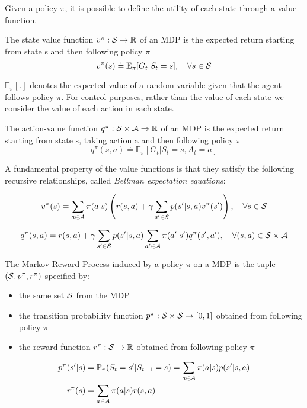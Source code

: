 Given a policy $\pi$, it is possible to define the utility of each state through a value function.
\begin{definition}
    The state value function $v^\pi: \mathcal{S} \to \mathbb{R}$ of an MDP is the expected return starting from state s and then following policy $\pi$
    \[v^\pi(s) \doteq \mathbb{E}_\pi[G_t | S_t=s],\quad \forall s \in \mathcal{S}\]
\end{definition}

$\mathbb{E}_\pi[.]$ denotes the expected value of a random variable given that the agent follows policy $\pi$. 
For control purposes, rather than the value of each state we consider the value of each action in each state.
\begin{definition}
    The action-value function $q^\pi: \mathcal{S} \times \mathcal{A} \to \mathbb{R}$ of an MDP is the expected return starting from state s, taking action a and then following policy $\pi$
    \[q^\pi(s,a) \doteq \mathbb{E}_\pi[G_t | S_t=s, A_t=a]\]
\end{definition}

A fundamental property of the value functions is that they satisfy
the following recursive relationships, called \textit{Bellman expectation equations}:

\begin{equation}
    \label{eq:bellman_v}
    v^\pi(s) = \sum_{a \in \mathcal{A}}\pi(a | s)\left( r(s, a) + \gamma \sum_{s' \in \mathcal{S}} p(s'|s,a) v^\pi(s') \right),\quad \forall s \in \mathcal{S}
\end{equation}

\begin{equation}
\label{eq:bellman_q}
q^\pi(s,a) = r(s,a) + \gamma \sum_{s' \in \mathcal{S}} p(s'|s,a)\sum_{a' \in \mathcal{A}}\pi(a'|s')q^\pi(s',a'),\quad \forall(s,a) \in \mathcal{S}\times\mathcal{A}
\end{equation}


\begin{definition}
    The Markov Reward Process induced by a policy $\pi$ on a MDP is the tuple $(\mathcal{S}, p^\pi, r^\pi)$ specified by:
    \begin{itemize}
    \item the same set $\mathcal{S}$ from the MDP
    \item the transition probability function $p^\pi: \mathcal{S} \times \mathcal{S} \to [0,1]$ obtained from following policy $\pi$
    \item the reward function $r^\pi: \mathcal{S} \to \mathbb{R}$ obtained from following policy $\pi$
    \end{itemize}
\end{definition}
\begin{align*}
    p^\pi(s'|s) &= \mathbb{P}_\pi(S_t=s'|S_{t-1}=s) = \sum_{a \in \mathcal{A}}\pi(a|s) p(s'|s,a) \\
    r^\pi(s) &= \sum_{a \in \mathcal{A}}\pi(a|s) r(s, a)
\end{align*}


